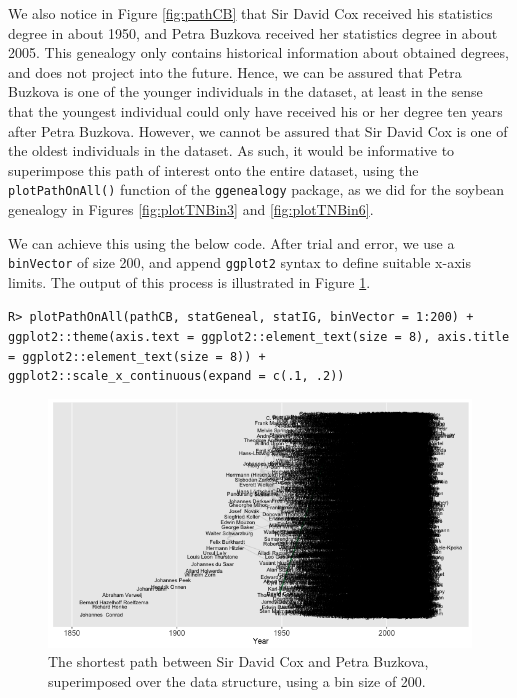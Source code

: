 \documentclass[11pt,a4paper,oldfontcommands,openany]{memoir}
\DeclareRobustCommand{\mybox}[2][gray!15]{%
\begin{tcolorbox}[   %
        breakable,
        left=0pt,
        right=0pt,
        top=0pt,
        bottom=0pt,
        colback=#1,
        colframe=#1,
        width=\dimexpr\textwidth\relax, 
        enlarge left by=0mm,
        boxsep=5pt,
        arc=0pt,outer arc=0pt,
        ]
        #2
\end{tcolorbox}
}
\numberwithin{equation}{section} %
\newcommand{\code}[1]{{\texttt{#1}}}
\newcommand{\pkg}[1]{{\texttt{#1}}}
\begin{document}
We also notice in Figure \ref{fig:pathCB} that Sir David Cox received his statistics degree in about 1950, and Petra Buzkova received her statistics degree in about 2005. This genealogy only contains historical information about obtained degrees, and does not project into the future. Hence, we can be assured that Petra Buzkova is one of the younger individuals in the dataset, at least in the sense that the youngest individual could only have received his or her degree ten years after Petra Buzkova. However, we cannot be assured that Sir David Cox is one of the oldest individuals in the dataset. As such, it would be informative to superimpose this path of interest onto the entire dataset, using the \code{plotPathOnAll()} function of the \pkg{ggenealogy} package, as we did for the soybean genealogy in Figures \ref{fig:plotTNBin3} and \ref{fig:plotTNBin6}.

We can achieve this using the below code. After trial and error, we use a \code{binVector} of size 200, and append \pkg{ggplot2} syntax to define suitable x-axis limits. The output of this process is illustrated in Figure \ref{fig:plotCBText}.

\mybox{
\texttt{R> plotPathOnAll(pathCB, statGeneal, statIG, binVector = 1:200) + ggplot2::theme(axis.text = ggplot2::element\_text(size = 8), axis.title = ggplot2::element\_text(size = 8)) + ggplot2::scale\_x\_continuous(expand = c(.1, .2))}
}

\begin{figure}[H]
    \begin{framed}
    \centering
    \includegraphics[width=\textwidth]{plotCBText}
    \end{framed}
    \caption{The shortest path between Sir David Cox and Petra Buzkova, superimposed over the data structure, using a bin size of 200.}
    \label{fig:plotCBText}
\end{figure}
\end{document}
